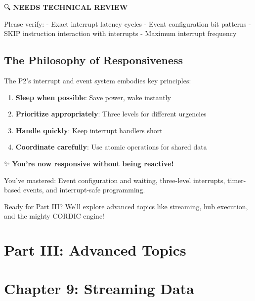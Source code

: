 \documentclass[11pt]{book}
\providecommand{\tightlist}{%
  \setlength{\itemsep}{0pt}\setlength{\parskip}{0pt}}
\begin{document}
\begin{review}
🔍 \textbf{NEEDS TECHNICAL REVIEW}

Please verify:
- Exact interrupt latency cycles
- Event configuration bit patterns
- SKIP instruction interaction with interrupts
- Maximum interrupt frequency
\end{review}

\hypertarget{the-philosophy-of-responsiveness}{%
\subsection{The Philosophy of
Responsiveness}\label{the-philosophy-of-responsiveness}}

The P2's interrupt and event system embodies key principles:

\begin{enumerate}
\def\labelenumi{\arabic{enumi}.}
\tightlist
\item
  \textbf{Sleep when possible}: Save power, wake instantly
\item
  \textbf{Prioritize appropriately}: Three levels for different
  urgencies
\item
  \textbf{Handle quickly}: Keep interrupt handlers short
\item
  \textbf{Coordinate carefully}: Use atomic operations for shared data
\end{enumerate}

\begin{chapterend}
✨ \textbf{You're now responsive without being reactive!}

You've mastered: Event configuration and waiting, three-level interrupts, timer-based events, and interrupt-safe programming.

Ready for Part III? We'll explore advanced topics like streaming, hub execution, and the mighty CORDIC engine!
\end{chapterend}

\hypertarget{part-iii-advanced-topics}{%
\section{Part III: Advanced Topics}\label{part-iii-advanced-topics}}

\hypertarget{chapter-9-streaming-data}{%
\section{Chapter 9: Streaming Data}\label{chapter-9-streaming-data}}
\end{document}
